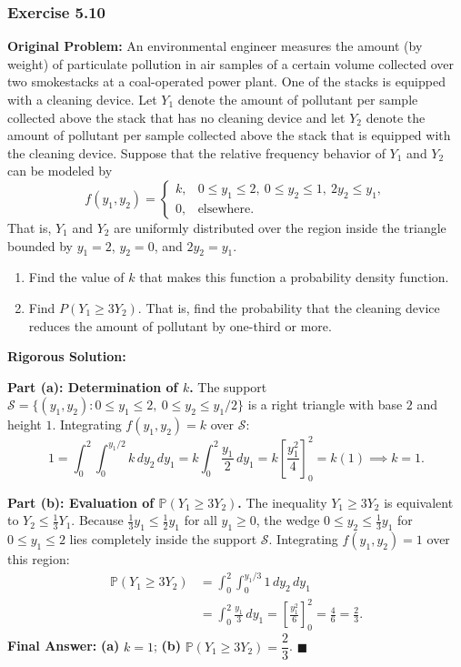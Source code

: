 \documentclass[11pt, letterpaper]{article}
\theoremstyle{definition}
\theoremstyle{remark}
\begin{document}
\subsubsection*{Exercise 5.10}
\textbf{Original Problem:} An environmental engineer measures the amount (by weight) of particulate pollution in air samples of a certain volume collected over two smokestacks at a coal-operated power plant. One of the stacks is equipped with a cleaning device. Let $Y_1$ denote the amount of pollutant per sample collected above the stack that has no cleaning device and let $Y_2$ denote the amount of pollutant per sample collected above the stack that is equipped with the cleaning device. Suppose that the relative frequency behavior of $Y_1$ and $Y_2$ can be modeled by
\[
    f(y_1, y_2) = \begin{cases}
        k, & 0 \le y_1 \le 2,\ 0 \le y_2 \le 1,\ 2y_2 \le y_1, \\
        0, & \text{elsewhere.}
    \end{cases}
\]
That is, $Y_1$ and $Y_2$ are uniformly distributed over the region inside the triangle bounded by $y_1 = 2$, $y_2 = 0$, and $2y_2 = y_1$.
\begin{enumerate}[label=\textbf{\alph*}]
    \item Find the value of $k$ that makes this function a probability density function.
    \item Find $P(Y_1 \ge 3Y_2)$. That is, find the probability that the cleaning device reduces the amount of pollutant by one-third or more.
\end{enumerate}

\textbf{Rigorous Solution:}

\textbf{Part (a): Determination of $k$.}
The support $\mathcal{S} = \{(y_1, y_2) : 0 \le y_1 \le 2,\ 0 \le y_2 \le y_1/2\}$ is a right triangle with base $2$ and height $1$. Integrating $f(y_1, y_2) = k$ over $\mathcal{S}$:
\[
    1 = \int_{0}^{2} \int_{0}^{y_1/2} k \, dy_2 \, dy_1 = k \int_{0}^{2} \frac{y_1}{2} \, dy_1 = k \left[ \frac{y_1^2}{4} \right]_{0}^{2} = k(1) \implies k = 1.
\]

\textbf{Part (b): Evaluation of $\mathbb{P}(Y_1 \ge 3Y_2)$.}
The inequality $Y_1 \ge 3Y_2$ is equivalent to $Y_2 \le \frac{1}{3} Y_1$. Because $\frac{1}{3} y_1 \le \frac{1}{2} y_1$ for all $y_1 \ge 0$, the wedge $0 \le y_2 \le \frac{1}{3} y_1$ for $0 \le y_1 \le 2$ lies completely inside the support $\mathcal{S}$. Integrating $f(y_1, y_2) = 1$ over this region:
\begin{align*}
    \mathbb{P}(Y_1 \ge 3Y_2) &= \int_{0}^{2} \int_{0}^{y_1/3} 1 \, dy_2 \, dy_1 \\
    &= \int_{0}^{2} \frac{y_1}{3} \, dy_1 = \left[ \frac{y_1^2}{6} \right]_{0}^{2} = \frac{4}{6} = \frac{2}{3}.
\end{align*}
\textbf{Final Answer:} \textbf{(a)} $k = 1$; \quad \textbf{(b)} $\mathbb{P}(Y_1 \ge 3Y_2) = \dfrac{2}{3}$. $\blacksquare$
\end{document}
